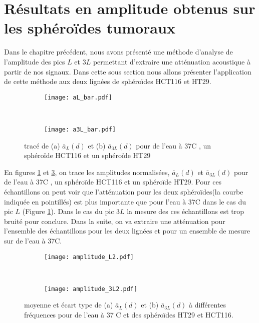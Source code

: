 \newpage
\section[Résultats amplitude obtenus sur sphéroïdes tumoraux]{Résultats en amplitude obtenus sur les sphéroïdes tumoraux%
              }

Dans le chapitre précédent, nous avons présenté une méthode d'analyse de l'amplitude des pics $L$ et $3L$ permettant d'extraire une atténuation acoustique à partir de nos signaux. Dans cette sous section nous allons présenter l'application de cette méthode aux deux lignées de sphéroïdes HCT116 et HT29.
\begin{figure}[ht!]
\begin{subfigure}{0.49\textwidth}
\texttt{[image: aL\_bar.pdf]}
\caption{\label{courbes_ajustees_sphero_L}}
\end{subfigure}
~~
\begin{subfigure}{0.49\textwidth}
\texttt{[image: a3L\_bar.pdf]}
\caption{\label{courbes_ajustees_sphero_3L}}
\end{subfigure}
\caption{tracé de (a)  $\bar{a}_L(d)$  et (b)  $\bar{a}_{3L}(d)$  pour de l'eau à 37\textdegree C , un sphéroïde HCT116 et un sphéroïde HT29}
\end{figure}
En figures \ref{courbes_ajustees_sphero_L} et \ref{courbes_ajustees_sphero_3L}, on trace les amplitudes normalisées, $\bar{a}_L(d)$ et  $\bar{a}_{3L}(d)$ pour de l'eau à 37\textdegree C , un sphéroïde HCT116 et un sphéroïde HT29. Pour ces échantillons on peut voir que l'atténuation pour les deux sphéroïdes(la courbe indiquée en pointillés) est plus importante que pour l'eau à 37\textdegree C dans le cas du pic $L$ (Figure \ref{courbes_ajustees_sphero_L}). Dans le cas du pic $3L$ la mesure des ces échantillons est trop bruité pour conclure. Dans la suite, on va extraire une atténuation pour l'ensemble des échantillons pour les deux lignées et pour un ensemble de mesure sur de l'eau à 37\textdegree C. 

\begin{figure}[ht!]
\begin{subfigure}{0.49\textwidth}
\texttt{[image: amplitude\_L2.pdf]}
\caption{\label{amplitude_L}}
\end{subfigure}
~~
\begin{subfigure}{0.49\textwidth}
\texttt{[image: amplitude\_3L2.pdf]}
\caption{\label{amplitude_3L}}
\end{subfigure}
\caption{moyenne et écart type de (a) $\bar{a}_L(d)$ et (b) $\bar{a}_{3L}(d)$ à différentes fréquences pour de l'eau à 37 \textdegree C et des sphéroïdes HT29 et HCT116. }
\end{figure}

